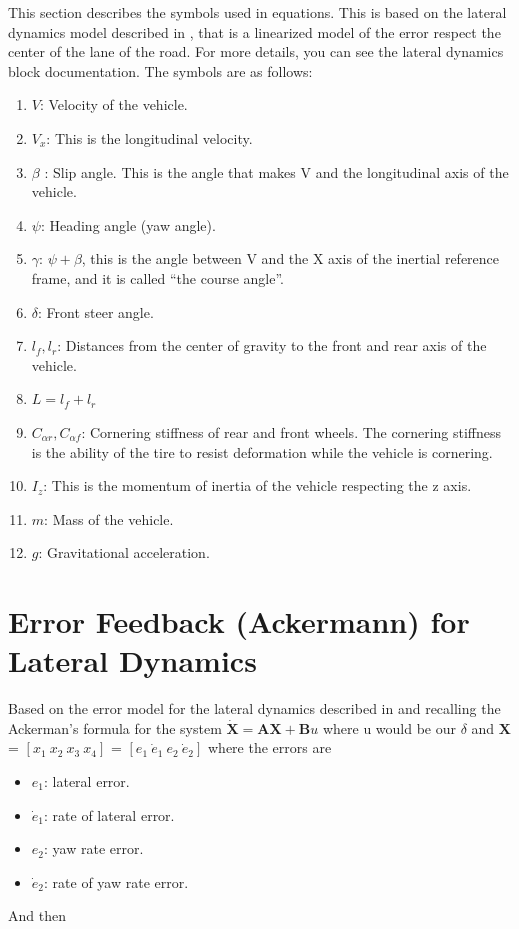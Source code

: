 \documentclass[12pt,a4paper]{cibb}
\begin{document}
This section describes the symbols used in equations. This is based on the lateral dynamics model described in \cite{rajamani2011vehicle}, that is a linearized model of the error respect the center of the lane of the road. For more details, you can see the lateral dynamics block documentation. The symbols are as follows:
\begin{enumerate}
     \item	\(V\): Velocity of the vehicle.
     \item	\(V_x\): This is the longitudinal velocity.
     \item	\(\beta\) : Slip angle. This is the angle that makes V and the longitudinal axis of the vehicle.
     \item	\(\psi\): Heading angle (yaw angle).
     \item	\(\gamma\): \(\psi+ \beta\), this is the angle between V and the X axis of the inertial reference frame, and it is called “the course angle”.
     \item	\(\delta\): Front steer angle.
     \item	\(l_f,l_r\): Distances from the center of gravity to the front and rear axis of the vehicle.
     \item	\(L= l_f+l_r\)
     \item	\(C_{\alpha r}, C_{\alpha f}\): Cornering stiffness of rear and front wheels. The cornering stiffness is the ability of the tire to resist deformation while the vehicle is cornering.
     \item	\(I_z\): This is the momentum of inertia of the vehicle respecting the z axis.
     \item   \(m\): Mass of the vehicle.
     \item  \(g\): Gravitational acceleration.
\end{enumerate}


\section{Error Feedback (Ackermann) for Lateral Dynamics}
\label{sec:PID4LateralDynamics}

Based on the error model for the lateral dynamics described in \cite{rajamani2011vehicle} and recalling the Ackerman’s formula for the system \(\dot{\textbf{X}} =\textbf{A}\textbf{X}+\textbf{B}u\) where u would be our \(\delta\) and $\textbf{X} $ = $ [x_1\ x_2\   x_3\ x_4] $ = $ [e_1\ \dot{e}_1\ e_2\ \dot{e}_2]$ where the errors are 
\begin{itemize}
  \item $e_1$: lateral error.
  \item $\dot{e}_1$: rate of lateral error.
  \item $e_2$: yaw rate error.
  \item $\dot{e}_2$: rate of yaw rate error.
\end{itemize}
And then 
\end{document}
